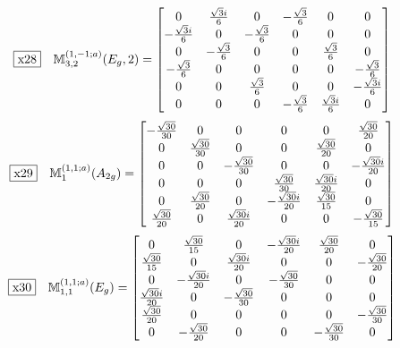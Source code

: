 \documentclass[fleqn,10pt,landscape]{jsarticle}
\begin{document}
\begin{dmath*}
\fbox{x28}\quad \mathbb{M}_{3,2}^{(1,-1;a)}(E_{g},2)=\begin{bmatrix} 0 & \frac{\sqrt{3} i}{6} & 0 & - \frac{\sqrt{3}}{6} & 0 & 0 \\ - \frac{\sqrt{3} i}{6} & 0 & - \frac{\sqrt{3}}{6} & 0 & 0 & 0 \\ 0 & - \frac{\sqrt{3}}{6} & 0 & 0 & \frac{\sqrt{3}}{6} & 0 \\ - \frac{\sqrt{3}}{6} & 0 & 0 & 0 & 0 & - \frac{\sqrt{3}}{6} \\ 0 & 0 & \frac{\sqrt{3}}{6} & 0 & 0 & - \frac{\sqrt{3} i}{6} \\ 0 & 0 & 0 & - \frac{\sqrt{3}}{6} & \frac{\sqrt{3} i}{6} & 0 \end{bmatrix}
\end{dmath*}
\begin{dmath*}
\fbox{x29}\quad \mathbb{M}_{1}^{(1,1;a)}(A_{2g})=\begin{bmatrix} - \frac{\sqrt{30}}{30} & 0 & 0 & 0 & 0 & \frac{\sqrt{30}}{20} \\ 0 & \frac{\sqrt{30}}{30} & 0 & 0 & \frac{\sqrt{30}}{20} & 0 \\ 0 & 0 & - \frac{\sqrt{30}}{30} & 0 & 0 & - \frac{\sqrt{30} i}{20} \\ 0 & 0 & 0 & \frac{\sqrt{30}}{30} & \frac{\sqrt{30} i}{20} & 0 \\ 0 & \frac{\sqrt{30}}{20} & 0 & - \frac{\sqrt{30} i}{20} & \frac{\sqrt{30}}{15} & 0 \\ \frac{\sqrt{30}}{20} & 0 & \frac{\sqrt{30} i}{20} & 0 & 0 & - \frac{\sqrt{30}}{15} \end{bmatrix}
\end{dmath*}
\begin{dmath*}
\fbox{x30}\quad \mathbb{M}_{1,1}^{(1,1;a)}(E_{g})=\begin{bmatrix} 0 & \frac{\sqrt{30}}{15} & 0 & - \frac{\sqrt{30} i}{20} & \frac{\sqrt{30}}{20} & 0 \\ \frac{\sqrt{30}}{15} & 0 & \frac{\sqrt{30} i}{20} & 0 & 0 & - \frac{\sqrt{30}}{20} \\ 0 & - \frac{\sqrt{30} i}{20} & 0 & - \frac{\sqrt{30}}{30} & 0 & 0 \\ \frac{\sqrt{30} i}{20} & 0 & - \frac{\sqrt{30}}{30} & 0 & 0 & 0 \\ \frac{\sqrt{30}}{20} & 0 & 0 & 0 & 0 & - \frac{\sqrt{30}}{30} \\ 0 & - \frac{\sqrt{30}}{20} & 0 & 0 & - \frac{\sqrt{30}}{30} & 0 \end{bmatrix}
\end{dmath*}
\end{document}
